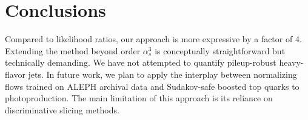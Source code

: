 \section{Conclusions}\label{sec:conclusions}

Compared to likelihood ratios, our approach is more expressive by a
factor of 4. Extending the method beyond order $\alpha_s^3$ is
conceptually straightforward but technically demanding. We have not
attempted to quantify pileup-robust heavy-flavor jets. In future work,
we plan to apply the interplay between normalizing flows trained on
ALEPH archival data and Sudakov-safe boosted top quarks to
photoproduction. The main limitation of this approach is its reliance on
discriminative slicing methods.

